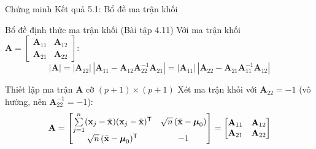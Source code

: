 \begin{frame}[t]{Chứng minh Kết quả 5.1: Bổ đề ma trận khối}
  \begin{block}{Bổ đề định thức ma trận khối (Bài tập 4.11)}
    Với ma trận khối $\mathbf{A} = \begin{bmatrix} \mathbf{A}_{11} & \mathbf{A}_{12} \\ \mathbf{A}_{21} & \mathbf{A}_{22} \end{bmatrix}$:
    \[
      |\mathbf{A}| = |\mathbf{A}_{22}|\,|\mathbf{A}_{11} - \mathbf{A}_{12}\mathbf{A}_{22}^{-1}\mathbf{A}_{21}| = |\mathbf{A}_{11}|\,|\mathbf{A}_{22} - \mathbf{A}_{21}\mathbf{A}_{11}^{-1}\mathbf{A}_{12}|
    \]
  \end{block}

  \begin{exampleblock}{Thiết lập ma trận $\mathbf{A}$ cỡ $(p+1) \times (p+1)$}
    Xét ma trận khối với $\mathbf{A}_{22} = -1$ (vô hướng, nên $\mathbf{A}_{22}^{-1} = -1$):
    \[
      \mathbf{A} =
      \begin{bmatrix}
        \sum\limits_{j=1}^n (\mathbf{x}_j - \bar{\mathbf{x}})(\mathbf{x}_j - \bar{\mathbf{x}})^{\mathsf T} & \sqrt{n}\,(\bar{\mathbf{x}} - \boldsymbol{\mu}_0) \\[6pt]
        \sqrt{n}\,(\bar{\mathbf{x}} - \boldsymbol{\mu}_0)^{\mathsf T} & -1
      \end{bmatrix}
      =
      \begin{bmatrix}
        \mathbf{A}_{11} & \mathbf{A}_{12} \\
        \mathbf{A}_{21} & \mathbf{A}_{22}
      \end{bmatrix}
    \]
  \end{exampleblock}
\end{frame}

